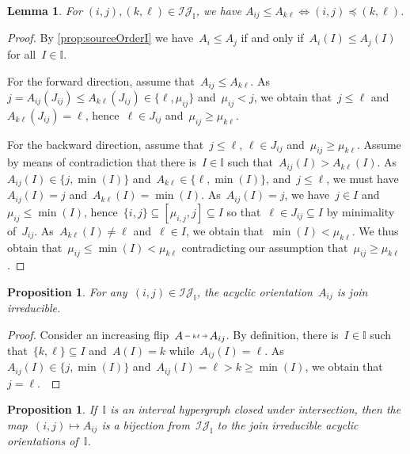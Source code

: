 \documentclass[reqno]{amsart}
\newtheorem{proposition}[theorem]{Proposition}
\newtheorem{lemma}[theorem]{Lemma}
\theoremstyle{definition}
\newcommand{\cal}[1]{\mathcal{#1}} %
\newcommand{\vincent}[1]{\todo[size=\tiny,color=blue!30]{ #1 \\ \hfill --- V.}\,}
\newcommand{\II}{\mathbb I} %
\newcommand{\cIJ}{\cal{IJ}} %
\newcommand{\flip}[4]{\ensuremath{#1 \, \begin{tikzpicture}[scale=1,baseline=-.1cm] \path[->]  (0,0) edge node[fill=white,inner sep=2pt, font=\tiny ] {$#2#3$} (.7,0); \end{tikzpicture} \, #4}}
\begin{document}
\begin{lemma}
\label{lem:irrorder2}
For $(i,j), (k,\ell) \in \cIJ_\II$, we have $A_{ij} \le A_{k\ell} \iff (i,j) \preccurlyeq (k,\ell)$.
\end{lemma}

\begin{proof}
By \cref{prop:sourceOrderI} we have~$A_i \le A_j$ if and only if~$A_i(I) \le A_j(I)$ for all~$I \in \II$.

For the forward direction, assume that~$A_{ij} \le A_{k\ell}$.
As~$j = A_{ij}(J_{ij}) \le A_{k\ell}(J_{ij}) \in \{\ell, \mu_{ij}\}$ and~$\mu_{ij} < j$, we obtain that~$j \le \ell$ and~$A_{k\ell}(J_{ij}) = \ell$, hence~$\ell \in J_{ij}$ and~$\mu_{ij} \ge \mu_{k\ell}$.

For the backward direction, assume that~$j \le \ell$, $\ell \in J_{ij}$ and~$\mu_{ij} \ge \mu_{k\ell}$.
Assume by means of contradiction that there is~$I \in \II$ such that~$A_{ij}(I) > A_{k\ell}(I)$.
As $A_{ij}(I) \in \{j, \min(I)\}$ and~$A_{k\ell} \in \{\ell, \min(I)\}$, and~$j \le \ell$, we must have~$A_{ij}(I) = j$ and~$A_{k\ell}(I) = \min(I)$.
As~$A_{ij}(I) = j$, we have~$j \in I$ and~$\mu_{ij} \le \min(I)$, hence~$\{i,j\} \subseteq [\mu_{i,j},j] \subseteq I$ so that~$\ell \in J_{ij} \subseteq I$ by minimality of~$J_{ij}$.
As~$A_{k\ell}(I) \ne \ell$ and~$\ell \in I$, we obtain that~$\min(I) < \mu_{k\ell}$.
We thus obtain that~$\mu_{ij} \le \min(I) < \mu_{k\ell}$ contradicting our assumption that~$\mu_{ij} \ge \mu_{k\ell}$.
\end{proof}

\begin{proposition}
\label{prop:AijJoinIrreducible}
For any~$(i,j) \in \cIJ_\II$, the acyclic orientation~$A_{ij}$ is join irreducible.
\end{proposition}

\begin{proof}
Consider an increasing flip~\flip{A}{k}{\ell}{A_{ij}}.
By definition, there is~$I \in \II$ such that~$\{k,\ell\} \subseteq I$ and~$A(I) = k$ while~$A_{ij}(I) = \ell$.
As $A_{ij}(I) \in \{j, \min(I)\}$ and~$A_{ij}(I) = \ell > k \ge \min(I)$, we obtain that~$j = \ell$.
\vincent{todo: prove that~$i = k$...}
\end{proof}

\begin{proposition}
\label{prop:joinIrreducibles}
If~$\II$ is an interval hypergraph closed under intersection, then the map~${(i,j) \mapsto A_{ij}}$ is a bijection from~$\cIJ_\II$ to the join irreducible acyclic orientations of~$\II$.
\end{proposition}
\end{document}
